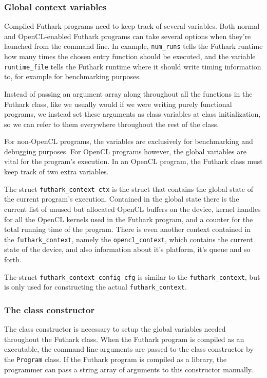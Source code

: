 \begin{description}
\subsubsection{Global context variables}
\label{globalcontextvariables}
Compiled Futhark programs need to keep track of several variables.
Both normal and OpenCL-enabled Futhark \csharp{} programs can take several
options when they're launched from the command line. In example,
\texttt{num\_runs} tells the Futhark runtime how many times the chosen entry
function should be executed, and the variable \texttt{runtime\_file} tells the
Futhark runtime where it should write timing information to, for example for
benchmarking purposes.

Instead of passing an argument array along throughout all the functions in the
Futhark class, like we usually would if we were writing purely functional
programs, we instead set these arguments as class variables at class
initialization, so we can refer to them everywhere throughout the rest of the class.

For non-OpenCL programs, the variables are exclusively for benchmarking and
debugging purposes. For OpenCL programs however, the global variables are vital
for the program's execution.
In an OpenCL program, the Futhark class must keep track of two extra
variables.

The struct \texttt{futhark\_context ctx} is the struct that contains the global
state of the current program's execution. Contained in the global state there is
the current list of unused but allocated OpenCL buffers on the device, kernel
handles for all the OpenCL kernels used in the Futhark program, and a counter
for the total running time of the program.
There is even another context contained in the \texttt{futhark\_context}, namely
the \texttt{opencl\_context}, which contains the current state of the device,
and also information about it's platform, it's queue and so forth.

The struct \texttt{futhark\_context\_config cfg} is similar to the
\texttt{futhark\_context}, but is only used for constructing the actual
\texttt{futhark\_context}.

\subsubsection{The class constructor}
The class constructor is necessary to setup the global variables needed
throughout the Futhark class. When the Futhark program is compiled as an
executable, the command line arguments are passed to the class constructor by
the \texttt{Program} class. If the Futhark program is compiled as a library, the
programmer can pass a string array of arguments to this constructor manually.


\end{description}
